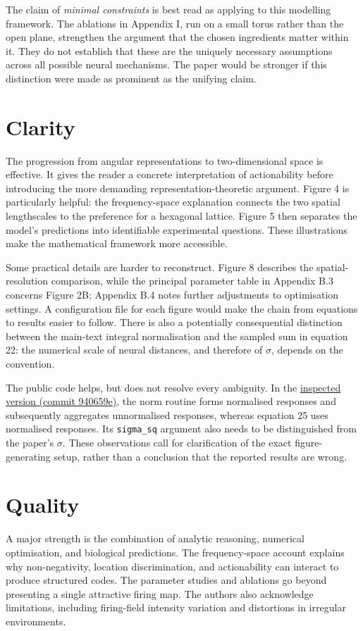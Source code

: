 \documentclass[10pt,letterpaper]{article}
\begin{document}
The claim of \emph{minimal constraints} is best read as applying to this modelling framework. The ablations in Appendix I, run on a small torus rather than the open plane, strengthen the argument that the chosen ingredients matter within it. They do not establish that these are the uniquely necessary assumptions across all possible neural mechanisms. The paper would be stronger if this distinction were made as prominent as the unifying claim.

\section{Clarity}
The progression from angular representations to two-dimensional space is effective. It gives the reader a concrete interpretation of actionability before introducing the more demanding representation-theoretic argument. Figure 4 is particularly helpful: the frequency-space explanation connects the two spatial lengthscales to the preference for a hexagonal lattice. Figure 5 then separates the model's predictions into identifiable experimental questions. These illustrations make the mathematical framework more accessible.

Some practical details are harder to reconstruct. Figure 8 describes the spatial-resolution comparison, while the principal parameter table in Appendix B.3 concerns Figure 2B; Appendix B.4 notes further adjustments to optimisation settings. A configuration file for each figure would make the chain from equations to results easier to follow. There is also a potentially consequential distinction between the main-text integral normalisation and the sampled sum in equation 22: the numerical scale of neural distances, and therefore of $\sigma$, depends on the convention.

The public code helps, but does not resolve every ambiguity. In the \href{https://github.com/WilburDoz/ICLR_Actionable_Reps/blob/940659ed2773f4cbb3bcf298bdb70497b30d250c/NRT_functions/losses.py}{inspected version (commit 940659e)}, the norm routine forms normalised responses and subsequently aggregates unnormalised responses, whereas equation 25 uses normalised responses. Its \texttt{sigma\_sq} argument also needs to be distinguished from the paper's $\sigma$. These observations call for clarification of the exact figure-generating setup, rather than a conclusion that the reported results are wrong.

\section{Quality}
A major strength is the combination of analytic reasoning, numerical optimisation, and biological predictions. The frequency-space account explains why non-negativity, location discrimination, and actionability can interact to produce structured codes. The parameter studies and ablations go beyond presenting a single attractive firing map. The authors also acknowledge limitations, including firing-field intensity variation and distortions in irregular environments.
\end{document}

